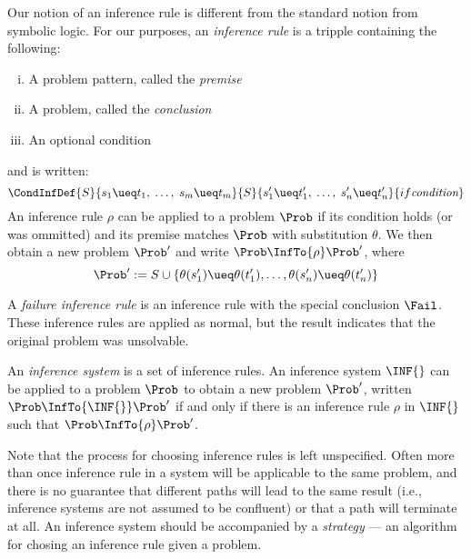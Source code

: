 Our notion of an inference rule is different from the standard notion from
symbolic logic. For our purposes, an \emph{inference rule} is a tripple
containing the following:
\begin{enumerate}[(i)]
    \item A problem pattern, called the \emph{premise}
    \item A problem, called the \emph{conclusion}
    \item An optional condition
\end{enumerate}
and is written:
\[\CondInfDef
    {S}{s_1 \ueq t_1, \; \dotsc, \; s_m \ueq t_m}
    {S}{s'_1 \ueq t'_1, \; \dotsc, \; s'_n \ueq t'_n}
    {if \textit{condition}}
\]
An inference rule $\rho$ can be applied to a problem $\Prob$ if its condition
holds (or was ommitted) and its premise matches $\Prob$ with substitution
$\theta$. We then obtain a new problem $\Prob'$ and write $\Prob \InfTo{\rho}
\Prob'$, where
\[ \Prob' := S \cup \{ \theta(s'_1) \ueq \theta(t'_1), \dotsc, \theta(s'_n)
\ueq \theta(t'_n) \} \]

A \emph{failure inference rule} is an inference rule with the special
conclusion $\Fail$. These inference rules are applied as normal, but the result
indicates that the original problem was unsolvable.

An \emph{inference system} is a set of inference rules. An inference system
$\INF{}$ can be applied to a problem $\Prob$ to obtain a new problem $\Prob'$,
written $\Prob \InfTo{\INF{}} \Prob'$ if and only if there is an inference rule
$\rho$ in $\INF{}$ such that $\Prob \InfTo{\rho} \Prob'$.

Note that the process for choosing inference rules is left unspecified. Often
more than once inference rule in a system will be applicable to the same
problem, and there is no guarantee that different paths will lead to the same
result (i.e., inference systems are not assumed to be confluent) or that a path
will terminate at all. An inference system should be accompanied by a
\emph{strategy} --- an algorithm for chosing an inference rule given a problem.

